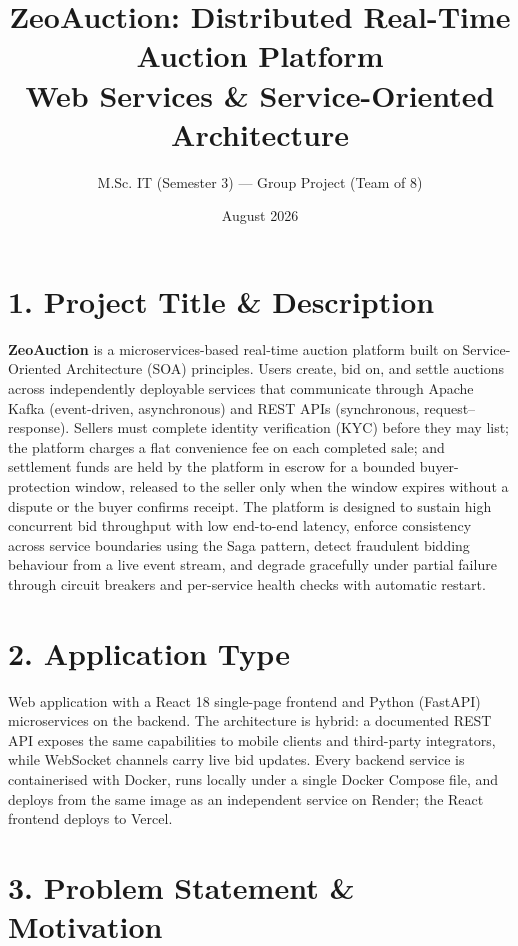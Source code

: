 \documentclass[11pt, a4paper]{article}
\title{\textbf{ZeoAuction: Distributed Real-Time Auction Platform}\\[2pt]
\normalsize Web Services \& Service-Oriented Architecture}
\author{M.Sc. IT (Semester 3) --- Group Project (Team of 8)}
\date{August 2026}
\newcommand{\secgap}{\vspace{0.06in}}
\begin{document}
\maketitle
\thispagestyle{fancy}

\section*{1. Project Title \& Description}

\textbf{ZeoAuction} is a microservices-based real-time auction platform built on
Service-Oriented Architecture (SOA) principles. Users create, bid on, and settle auctions
across independently deployable services that communicate through Apache Kafka
(event-driven, asynchronous) and REST APIs (synchronous, request--response). Sellers must
complete identity verification (KYC) before they may list; the platform charges a flat
convenience fee on each completed sale; and settlement funds are held by the platform in
escrow for a bounded buyer-protection window, released to the seller only when the window
expires without a dispute or the buyer confirms receipt. The platform is designed to
sustain high concurrent bid throughput with low end-to-end latency, enforce consistency
across service boundaries using the Saga pattern, detect fraudulent bidding behaviour from
a live event stream, and degrade gracefully under partial failure through circuit breakers
and per-service health checks with automatic restart.

\secgap
\section*{2. Application Type}

Web application with a React 18 single-page frontend and Python (FastAPI) microservices on
the backend. The architecture is hybrid: a documented REST API exposes the same
capabilities to mobile clients and third-party integrators, while WebSocket channels carry
live bid updates. Every backend service is containerised with Docker, runs locally under a
single Docker Compose file, and deploys from the same image as an independent service on
Render; the React frontend deploys to Vercel.

\secgap
\section*{3. Problem Statement \& Motivation}
\end{document}
